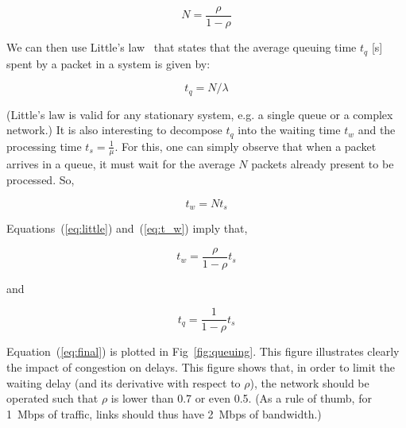 \begin{equation}
N = \frac{\rho}{1-\rho}
\end{equation}

We can then use Little's law~\cite{littleLaw} that states that the average queuing time \(t_q\) [s] spent by a packet in a system is given by:

\begin{equation}
\label{eq:little}
t_q = N/\lambda
\end{equation}

(Little's law is valid for any stationary system, e.g. a single queue or a complex network.) It is also interesting to decompose \(t_q\) into the waiting time \(t_w\) and the processing time \(t_s = \frac{1}{\mu}\). For this, one can simply observe that when a packet arrives in a queue, it must wait for the average \(N\) packets already present to be processed. So,

\begin{equation}
\label{eq:t_w}
t_w = N t_s
\end{equation}

Equations~(\ref{eq:little}) and~(\ref{eq:t_w}) imply that,

\begin{equation}
t_w = \frac{\rho}{1-\rho} t_s
\end{equation}

\noindent and

\begin{equation}
\label{eq:final}
t_q = \frac{1}{1-\rho} t_s
\end{equation}

Equation~(\ref{eq:final}) is plotted in Fig~\ref{fig:queuing}. This figure illustrates clearly the impact of congestion on delays. This figure shows that, in order to limit the waiting delay (and its derivative with respect to \(\rho\)), the network should be operated such that \(\rho\) is lower than 0.7 or even 0.5. (As a rule of thumb, for 1~Mbps of traffic, links should thus have 2~Mbps of bandwidth.)

